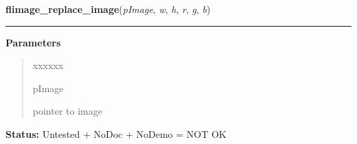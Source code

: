 \hspace{.8\funcindent}\begin{boxedminipage}{\funcwidth}

    \raggedright \textbf{flimage\_replace\_image}(\textit{pImage}, \textit{w}, \textit{h}, \textit{r}, \textit{g}, \textit{b})

    \vspace{-1.5ex}

    \rule{\textwidth}{0.5\fboxrule}
\setlength{\parskip}{2ex}
\setlength{\parskip}{1ex}
      \textbf{Parameters}
      \vspace{-1ex}

      \begin{quote}
        \begin{Ventry}{xxxxxx}

          \item[pImage]

          pointer to image

        \end{Ventry}

      \end{quote}

\textbf{Status:} Untested + NoDoc + NoDemo = NOT OK



    \end{boxedminipage}

    \label{xformslib:flflimage:flimage_swapbuffer}

    \vspace{0.5ex}

